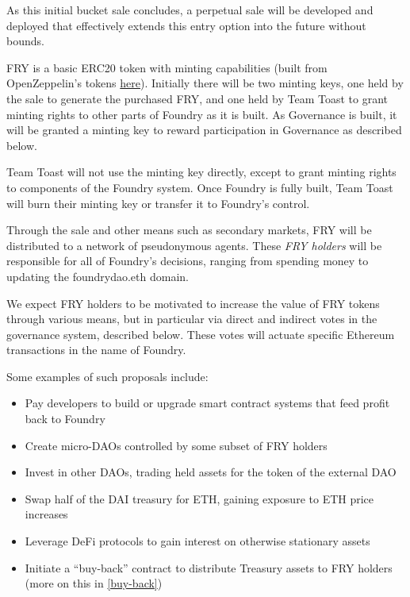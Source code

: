 As this initial bucket sale concludes, a perpetual sale will be developed and deployed that effectively extends this entry option into the future without bounds.

FRY is a basic ERC20 token with minting capabilities (built from OpenZeppelin's tokens \href{https://github.com/OpenZeppelin/openzeppelin-contracts/tree/b1e811430a0a57211bdc5d48bee0fe0ba9101139/contracts/token/ERC20}{here}). Initially there will be two minting keys, one held by the sale to generate the purchased FRY, and one held by Team Toast to grant minting rights to other parts of Foundry as it is built. As Governance is built, it will be granted a minting key to reward participation in Governance as described below.

Team Toast will not use the minting key directly, except to grant minting rights to components of the Foundry system. Once Foundry is fully built, Team Toast will burn their minting key or transfer it to Foundry's control.

Through the sale and other means such as secondary markets, FRY will be distributed to a network of pseudonymous agents. These \textit{FRY holders} will be responsible for all of Foundry's decisions, ranging from spending money to updating the foundrydao.eth domain.

We expect FRY holders to be motivated to increase the value of FRY tokens through various means, but in particular via direct and indirect votes in the governance system, described below. These votes will actuate specific Ethereum transactions in the name of Foundry.

Some examples of such proposals include:

\begin{itemize}

\item Pay developers to build or upgrade smart contract systems that feed profit back to Foundry

\item Create micro-DAOs controlled by some subset of FRY holders

\item Invest in other DAOs, trading held assets for the token of the external DAO

\item Swap half of the DAI treasury for ETH, gaining exposure to ETH price increases

\item Leverage DeFi protocols to gain interest on otherwise stationary assets

\item Initiate a ``buy-back'' contract to distribute Treasury assets to FRY holders (more on this in \ref{buy-back})

\end{itemize}

